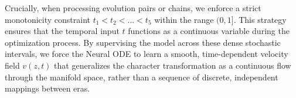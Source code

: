 \documentclass{article}
\begin{document}
Crucially, when processing evolution pairs or chains, we enforce a strict monotonicity constraint $t_1 < t_2 < \dots < t_5$ within the range $(0, 1]$. This strategy ensures that the temporal input $t$ functions as a continuous variable during the optimization process. By supervising the model across these dense stochastic intervals, we force the Neural ODE to learn a smooth, time-dependent velocity field $v(z, t)$ that generalizes the character transformation as a continuous flow through the manifold space, rather than a sequence of discrete, independent mappings between eras.









\end{document}

